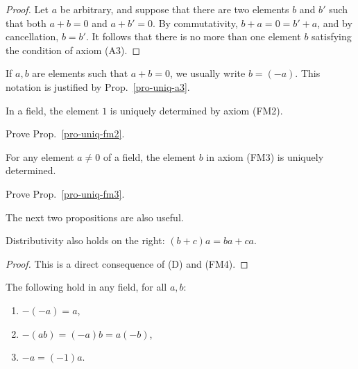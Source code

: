 {\begin{proof}
  Let $a$ be arbitrary, and suppose that there are two elements $b$
  and $b'$ such that both $a+b=0$ and $a+b'=0$. By commutativity,
  $b+a=0=b'+a$, and by cancellation, $b=b'$. It follows that there is
  no more than one element $b$ satisfying the condition of axiom (A3).
\end{proof}

\begin{remark}
  If $a,b$ are elements such that $a+b=0$, we usually write $b=(-a)$. 
  This notation is justified by Prop.~\ref{pro-uniq-a3}.
\end{remark}

\begin{proposition}\label{pro-uniq-fm2}
  In a field, the element $1$ is uniquely determined by axiom (FM2).
\end{proposition}

\begin{nproblem}
  Prove Prop.~\ref{pro-uniq-fm2}.
\end{nproblem}

\begin{proposition}\label{pro-uniq-fm3}
  For any element $a\neq 0$ of a field, the element $b$ in axiom (FM3)
  is uniquely determined.
\end{proposition}

\begin{nproblem}
  Prove Prop.~\ref{pro-uniq-fm3}.
\end{nproblem}

The next two propositions are also useful.

\begin{proposition}
  Distributivity also holds on the right: $(b+c)a = ba + ca$.
\end{proposition}

\begin{proof}
  This is a direct consequence of (D) and (FM4).\eot
\end{proof}

\begin{proposition}
  The following hold in any field, for all $a,b$:
  \begin{enumerate}\alphalabels
  \item $-(-a) = a$,
  \item $-(ab) = (-a)b = a(-b)$,
  \item $-a = (-1)a$.
  \end{enumerate}
\end{proposition}

}

